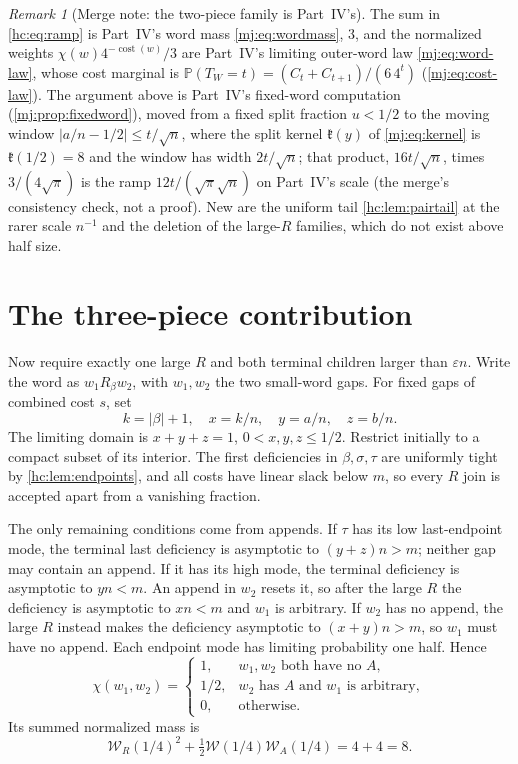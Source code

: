 \documentclass[11pt,a4paper]{article}
\theoremstyle{definition}\newaliascnt{definition}{theorem}
\theoremstyle{remark}\newaliascnt{remark}{theorem}
\newtheorem{remark}[remark]{Remark}
\newcommand{\ljP}{\mathbb P}
\newcommand{\ljcost}{\operatorname{cost}}
\begin{document}
\begin{remark}[Merge note: the two-piece family is Part~IV's]
The sum in \eqref{hc:eq:ramp} is Part~IV's word mass \eqref{mj:eq:wordmass},
$3$, and the normalized weights $\chi(w)4^{-\ljcost(w)}/3$ are Part~IV's
limiting outer-word law \eqref{mj:eq:word-law}, whose cost marginal is
$\ljP(T_W=t)=(C_t+C_{t+1})/(6\,4^t)$ (\eqref{mj:eq:cost-law}). The argument
above is Part~IV's fixed-word computation (\cref{mj:prop:fixedword}), moved
from a fixed split fraction $u<1/2$ to the moving window
$|a/n-1/2|\le t/\sqrt n$, where the split kernel $\mathfrak k(y)$ of
\eqref{mj:eq:kernel} is $\mathfrak k(1/2)=8$ and the window has width
$2t/\sqrt n$; that product, $16t/\sqrt n$, times $3/(4\sqrt\pi)$ is the ramp
$12t/(\sqrt\pi\sqrt n)$ on Part~IV's scale (the merge's consistency check, not a proof). New are the uniform tail
\cref{hc:lem:pairtail} at the rarer scale $n^{-1}$ and the deletion of the
large-$R$ families, which do not exist above half size.
\end{remark}

\section{The three-piece contribution}
\label{hc:sec:threepiece}
Now require exactly one large $R$ and both terminal children larger than
$\varepsilon n$. Write the word as $w_1R_\beta w_2$, with $w_1,w_2$ the two
small-word gaps. For fixed gaps of combined cost $s$, set
\[
 k=|\beta|+1,\quad x=k/n,\quad y=a/n,\quad z=b/n.
\]
The limiting domain is $x+y+z=1$, $0<x,y,z\le1/2$. Restrict initially to a
compact subset of its interior. The first deficiencies in $\beta,\sigma,\tau$
are uniformly tight by \cref{hc:lem:endpoints}, and all costs have linear
slack below $m$, so every $R$ join is accepted apart from a vanishing
fraction.

The only remaining conditions come from appends. If $\tau$ has its low
last-endpoint mode, the terminal last deficiency is asymptotic to
$(y+z)n>m$; neither gap may contain an append. If it has its high mode, the
terminal deficiency is asymptotic to $yn<m$. An append in $w_2$ resets it,
so after the large $R$ the deficiency is asymptotic to $xn<m$ and $w_1$ is
arbitrary. If $w_2$ has no append, the large $R$ instead makes the
deficiency asymptotic to $(x+y)n>m$, so $w_1$ must have no append. Each
endpoint mode has limiting probability one half. Hence
\begin{equation}\label{hc:eq:chi2}
 \chi(w_1,w_2)=
 \begin{cases}
 1,&w_1,w_2\text{ both have no }A,\\
 1/2,&w_2\text{ has }A\text{ and }w_1\text{ is arbitrary},\\
 0,&\text{otherwise}.
 \end{cases}
\end{equation}
Its summed normalized mass is
\begin{equation}\label{hc:eq:8}
 \mathcal W_R(1/4)^2+\tfrac12\mathcal W(1/4)\mathcal W_A(1/4)=4+4=8.
\end{equation}
\end{document}
